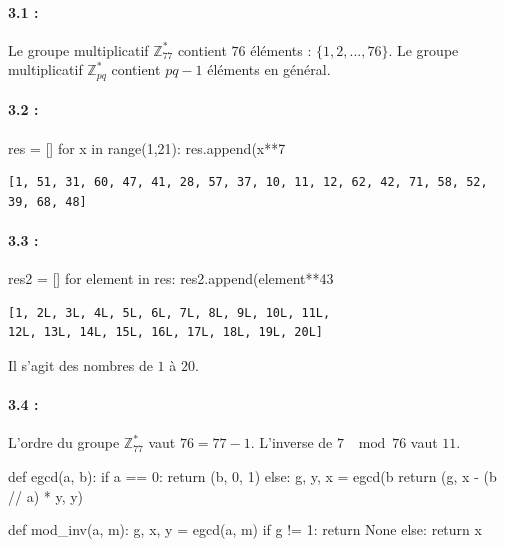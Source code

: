 \documentclass[11pt,a4paper]{report}
\begin{document}
\paragraph*{3.1 : } Le groupe multiplicatif $\mathbb{Z}^*_{77}$ contient $76$ éléments : $\{1,2,...,76\}$. Le groupe multiplicatif $\mathbb{Z}^*_{pq}$ contient $pq-1$ éléments en général.

\paragraph*{3.2 : }
\begin{pythoncode}
res = []
for x in range(1,21):
    res.append(x**7 %
\end{pythoncode}
\begin{verbatim}
[1, 51, 31, 60, 47, 41, 28, 57, 37, 10, 11, 12, 62, 42, 71, 58, 52, 39, 68, 48]
\end{verbatim}

\paragraph*{3.3 : }
\begin{pythoncode}
res2 = []
for element in res:
    res2.append(element**43 %
\end{pythoncode}
\begin{verbatim}
[1, 2L, 3L, 4L, 5L, 6L, 7L, 8L, 9L, 10L, 11L, 
12L, 13L, 14L, 15L, 16L, 17L, 18L, 19L, 20L]
\end{verbatim}

Il s'agit des nombres de $1$ à $20$.

\paragraph*{3.4 : } L'ordre du groupe $\mathbb{Z}^*_{77}$ vaut $76 = 77 - 1$. L'inverse de $7$ $\mod 76$ vaut $11$.

\begin{pythoncode}
def egcd(a, b):
    if a == 0:
        return (b, 0, 1)
    else:
        g, y, x = egcd(b %
        return (g, x - (b // a) * y, y)


def mod_inv(a, m):
    g, x, y = egcd(a, m)
    if g != 1:
        return None
    else:
        return x %
\end{pythoncode}
\end{document}
